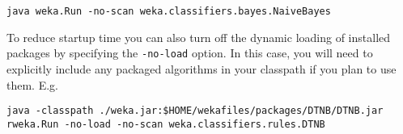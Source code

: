 {\scriptsize
\begin{verbatim}
java weka.Run -no-scan weka.classifiers.bayes.NaiveBayes
\end{verbatim}}

To reduce startup time you can also turn off the dynamic loading of
installed packages by specifying the \texttt{-no-load} option. In this
case, you will need to explicitly include any packaged algorithms in
your classpath if you plan to use them. E.g.

{\scriptsize
\begin{verbatim}
java -classpath ./weka.jar:$HOME/wekafiles/packages/DTNB/DTNB.jar rweka.Run -no-load -no-scan weka.classifiers.rules.DTNB
\end{verbatim}}



